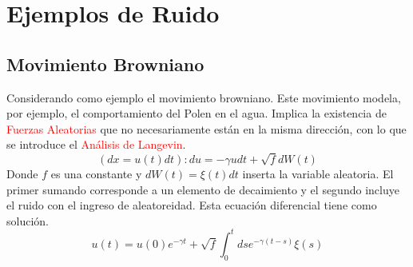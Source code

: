 \documentclass{book}
\begin{document}
\section{Ejemplos de Ruido}
\subsection{Movimiento Browniano}
Considerando como ejemplo el movimiento browniano. Este movimiento modela, por ejemplo, el comportamiento del Polen en el agua. Implica la existencia de \textcolor{red}{Fuerzas Aleatorias} que no necesariamente están en la misma dirección, con lo que se introduce el \textcolor{red}{Análisis de Langevin}.
\begin{equation}\label{eq6.1}(dx=u(t)dt): du=-\gamma u dt +\sqrt{f}dW(t)\end{equation} Donde $f$ es una constante y $dW(t)=\xi(t) dt$ inserta la variable aleatoria. El primer sumando corresponde a un elemento de decaimiento y el segundo incluye el ruido con el ingreso de aleatoreidad.
Esta ecuación diferencial tiene como solución.
\begin{equation}\label{eq6.2} u(t)=u(0)e^{-\gamma t}+\sqrt{f}\int_0^t ds e^{-\gamma(t-s)}\xi(s)\end{equation}
\end{document}
